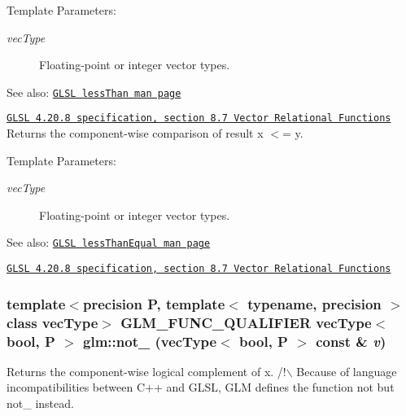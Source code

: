 \begin{Desc}
\item[Template Parameters:]
\begin{description}
\item[{\em vecType}]Floating-point or integer vector types.\end{description}
\end{Desc}
\begin{Desc}
\item[See also:]\href{http://www.opengl.org/sdk/docs/manglsl/xhtml/lessThan.xml}{\tt GLSL lessThan man page} 

\href{http://www.opengl.org/registry/doc/GLSLangSpec.4.20.8.pdf}{\tt GLSL 4.20.8 specification, section 8.7 Vector Relational Functions} Returns the component-wise comparison of result x $<$= y.\end{Desc}
\begin{Desc}
\item[Template Parameters:]
\begin{description}
\item[{\em vecType}]Floating-point or integer vector types.\end{description}
\end{Desc}
\begin{Desc}
\item[See also:]\href{http://www.opengl.org/sdk/docs/manglsl/xhtml/lessThanEqual.xml}{\tt GLSL lessThanEqual man page} 

\href{http://www.opengl.org/registry/doc/GLSLangSpec.4.20.8.pdf}{\tt GLSL 4.20.8 specification, section 8.7 Vector Relational Functions} \end{Desc}
\hypertarget{group__core__func__vector__relational_g3f686b22d487d7d06447b15d3c621d2f}{
\subsubsection[not\_\-]{\setlength{\rightskip}{0pt plus 5cm}template$<$precision P, template$<$ typename, precision $>$ class vecType$>$ GLM\_\-FUNC\_\-QUALIFIER vecType$<$ bool, P $>$ glm::not\_\- (vecType$<$ bool, P $>$ const \& {\em v})}}
\label{group__core__func__vector__relational_g3f686b22d487d7d06447b15d3c621d2f}


Returns the component-wise logical complement of x. /!$\backslash$ Because of language incompatibilities between C++ and GLSL, GLM defines the function not but not\_\- instead.

